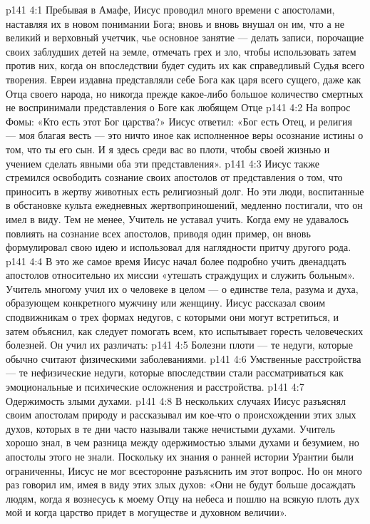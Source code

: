 \vs p141 4:1 Пребывая в Амафе, Иисус проводил много времени с апостолами, наставляя их в новом понимании Бога; вновь и вновь внушал он им, что  а не великий и верховный учетчик, чье основное занятие --- делать записи, порочащие своих заблудших детей на земле, отмечать грех и зло, чтобы использовать затем против них, когда он впоследствии будет судить их как справедливый Судья всего творения. Евреи издавна представляли себе Бога как царя всего сущего, даже как Отца своего народа, но никогда прежде какое\hyp{}либо большое количество смертных не воспринимали представления о Боге как любящем Отце 
\vs p141 4:2 На вопрос Фомы: «Кто есть этот Бог царства?» Иисус ответил: «Бог есть  Отец, и религия --- моя благая весть --- это ничто иное как исполненное веры осознание истины о том, что ты его сын. И я здесь среди вас во плоти, чтобы своей жизнью и учением сделать явными оба эти представления».
\vs p141 4:3 Иисус также стремился освободить сознание своих апостолов от представления о том, что приносить в жертву животных есть религиозный долг. Но эти люди, воспитанные в обстановке культа ежедневных жертвоприношений, медленно постигали, что он имел в виду. Тем не менее, Учитель не уставал учить. Когда ему не удавалось повлиять на сознание всех апостолов, приводя один пример, он вновь формулировал свою идею и использовал для наглядности притчу другого рода.
\vs p141 4:4 \pc В это же самое время Иисус начал более подробно учить двенадцать апостолов относительно их миссии «утешать страждущих и служить больным». Учитель многому учил их о человеке в целом --- о единстве тела, разума и духа, образующем конкретного мужчину или женщину. Иисус рассказал своим сподвижникам о трех формах недугов, с которыми они могут встретиться, и затем объяснил, как следует помогать всем, кто испытывает горесть человеческих болезней. Он учил их различать:
\vs p141 4:5 \bibnobreakspace Болезни плоти --- те недуги, которые обычно считают физическими заболеваниями.
\vs p141 4:6 \bibnobreakspace Умственные расстройства --- те нефизические недуги, которые впоследствии стали рассматриваться как эмоциональные и психические осложнения и расстройства.
\vs p141 4:7 \bibnobreakspace Одержимость злыми духами.
\vs p141 4:8 \pc В нескольких случаях Иисус разъяснял своим апостолам природу и рассказывал им кое\hyp{}что о происхождении этих злых духов, которых в те дни часто называли также нечистыми духами. Учитель хорошо знал, в чем разница между одержимостью злыми духами и безумием, но апостолы этого не знали. Поскольку их знания о ранней истории Урантии были ограниченны, Иисус не мог всесторонне разъяснить им этот вопрос. Но он много раз говорил им, имея в виду этих злых духов: «Они не будут больше досаждать людям, когда я вознесусь к моему Отцу на небеса и пошлю на всякую плоть дух мой и когда царство придет в могуществе и духовном величии».
